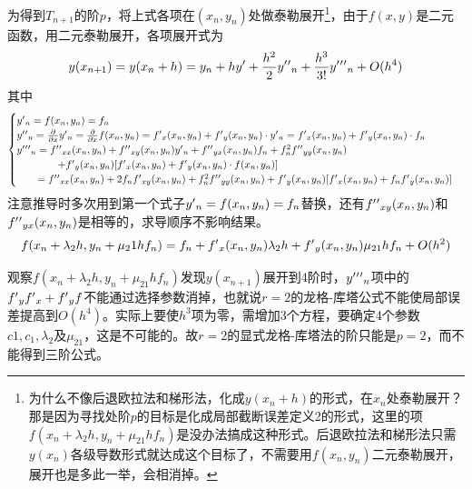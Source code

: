 为得到$T_{n+1}$的阶$p$，将上式各项在$(x_n,y_n)$处做泰勒展开\footnote{为什么不像后退欧拉法和梯形法，化成$y(x_n+h)$的形式，在$x_n$处泰勒展开？那是因为寻找处阶$p$的目标是化成局部截断误差定义2的形式，这里的项$f(x_n+\lambda_2h,y_n+\mu_{21}hf_n)$是没办法搞成这种形式。后退欧拉法和梯形法只需$y(x_n)$各级导数形式就达成这个目标了，不需要用$f(x_n,y_n)$二元泰勒展开，展开也是多此一举，会相消掉。}，由于$f(x,y)$是二元函数，用二元泰勒展开，各项展开式为
\begin{align*}
y(x_{n+1}) = y(x_n+h)=y_n+hy\rq{}+\frac{h^2}{2}y\rq{}\rq{}_n+\frac{h^3}{3!}y\rq{}\rq{}\rq{}_n+O(h^4)
\end{align*}
其中
$$\begin{cases}
y\rq{}_n =f(x_n,y_n)=f_n\\
y\rq{}\rq{}_n=\frac{\partial}{\partial x}y\rq{}_n=\frac{\partial}{\partial x}f(x_n,y_n)=f\rq{}_x(x_n,y_n)+f\rq{}_y(x_n,y_n)\cdot y\rq{}_n=f\rq{}_x(x_n,y_n)+f\rq{}_y(x_n,y_n)\cdot f_n\\
y\rq{}\rq{}\rq{}_n=f\rq{}\rq{}_{xx}(x_n,y_n)+f\rq{}\rq{}_{xy}(x_n,y_n)y\rq{}_n
+f\rq{}\rq{}_{yx}(x_n,y_n)f_n+f^2_nf\rq{}\rq{}_{yy}(x_n,y_n)\\
\qquad\qquad+f\rq{}_y(x_n,y_n)[f\rq{}_x(x_n,y_n)+f\rq{}_y(x_n,y_n)\cdot f(x_n,y_n)]\\
\qquad =f\rq{}\rq{}_{xx}(x_n,y_n)+2f_nf\rq{}_{xy}(x_n,y_n)+f^2_nf\rq{}\rq{}_{yy}(x_n,y_n)+f\rq{}_y(x_n,y_n)[f\rq{}_x(x_n,y_n)+f_nf\rq{}_y(x_n,y_n)]
\end{cases}$$
注意推导时多次用到第一个式子$y\rq{}_n =f(x_n,y_n)=f_n$替换，还有$f\rq{}\rq{}_{xy}(x_n,y_n)$和$f\rq{}\rq{}_{yx}(x_n,y_n)$是相等的，求导顺序不影响结果。
\begin{align*}
f(x_n+\lambda_2h,y_n+\mu_21hf_n)
=f_n+f\rq{}_x(x_n,y_n)\lambda_2h+f\rq{}_y(x_n,y_n)\mu_{21}hf_n+O(h^2)
\end{align*}

观察$f(x_n+\lambda_2h,y_n+\mu_{21}hf_n)$发现$y(x_{n+1})$展开到4阶时，$y\rq{}\rq{}\rq{}_n$项中的$f\rq{}_yf\rq{}_x+f\rq{}_yf$不能通过选择参数消掉，也就说$r=2$的龙格-库塔公式不能使局部误差提高到$O(h^4)$。实际上要使$h^3$项为零，需增加3个方程，要确定4个参数$c1,c_1,\lambda_2$及$\mu_{21}$，这是不可能的。故$r=2$的显式龙格-库塔法的阶只能是$p=2$，而不能得到三阶公式。

